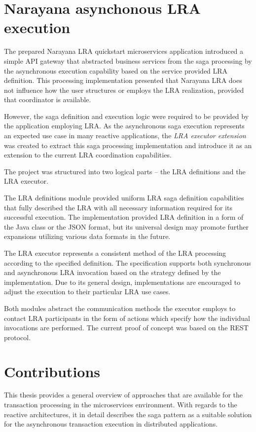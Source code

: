 \documentclass[oneside,
  digital, %
  table,   %
  lof,     %
  lot,     %
]{fithesis3}
\begin{document}
\section{Narayana asynchonous LRA execution}

The prepared Narayana LRA quickstart microservices application introduced a simple API gateway that abstracted business services from the saga processing by the asynchronous execution capability based on the service provided LRA definition. This processing implementation presented that Narayana LRA does not influence how the user structures or employs the LRA realization, provided that coordinator is available.

However, the saga definition and execution logic were required to be provided by the application employing LRA. As the asynchronous saga execution represents an expected use case in many reactive applications, the \textit{LRA executor extension} was created to extract this saga processing implementation and introduce it as an extension to the current LRA coordination capabilities.

The project was structured into two logical parts -- the LRA definitions and the LRA executor.

The LRA definitions module provided uniform LRA saga definition capabilities that fully described the LRA with all necessary information required for its successful execution. The implementation provided LRA definition in a form of the Java class or the JSON format, but its universal design may promote further expansions utilizing various data formats in the future. 

The LRA executor represents a consistent method of the LRA processing according to the specified definition. The specification supports both synchronous and asynchronous LRA invocation based on the strategy defined by the implementation. Due to its general design, implementations are encouraged to adjust the execution to their particular LRA use cases.

Both modules abstract the communication methods the executor employs to contact LRA participants in the form of actions which specify how the individual invocations are performed. The current proof of concept was based on the REST protocol.

\section{Contributions}

This thesis provides a general overview of approaches that are available for the transaction processing in the microservices environment. With regards to the reactive architectures, it in detail describes the saga pattern as a suitable solution for the asynchronous transaction execution in distributed applications.
\end{document}
